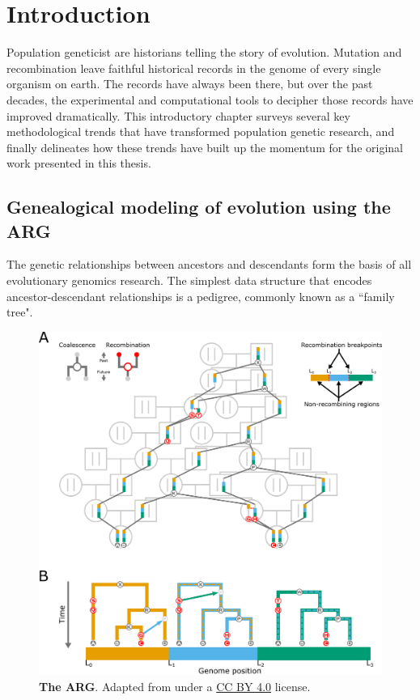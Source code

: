 \chapter{Introduction}

Population geneticist are historians telling the story of evolution. Mutation and recombination leave faithful historical records in the genome of every single organism on earth. The records have always been there, but over the past decades, the experimental and computational tools to decipher those records have improved dramatically. This introductory chapter surveys several key methodological trends that have transformed population genetic research, and finally delineates how these trends have built up the momentum for the original work presented in this thesis.

\section{Genealogical modeling of evolution using the \acl{ARG}}

The genetic relationships between ancestors and descendants form the basis of all evolutionary genomics research. The simplest data structure that encodes ancestor-descendant relationships is a pedigree, commonly known as a ``family tree". 

\begin{figure}%
    \centering
    \includegraphics[width=\textwidth]{adapted_figs/arg_illustration.png}
    \caption[The \acf{ARG}]{\textbf{The \acf{ARG}}. Adapted from \cite{lewanski2023era} under a \href{https://creativecommons.org/licenses/by/4.0/}{CC BY 4.0} license.}
    \label{fig:intro-F1}
\end{figure}

